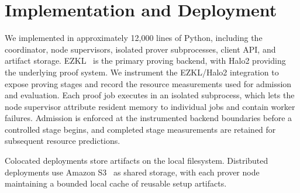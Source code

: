 \section{Implementation and Deployment}
We implemented \TITLE{} in approximately 12{,}000 lines of Python,
including the coordinator, node supervisors, isolated prover subprocesses,
client API, and artifact storage. EZKL~\cite{ezkl} is the primary proving
backend, with Halo2 providing the underlying proof system. We instrument the
EZKL/Halo2 integration to expose proving stages and record the resource
measurements used for admission and evaluation.
Each proof job executes in an isolated subprocess, which lets the node
supervisor attribute resident memory to individual jobs and contain worker
failures. Admission is enforced at the instrumented backend boundaries before
a controlled stage begins, and completed stage measurements are retained for
subsequent resource predictions.

Colocated deployments store artifacts on the local filesystem. Distributed
deployments use Amazon S3~\cite{aws-s3} as shared storage, with each prover
node maintaining a bounded local cache of reusable setup artifacts.
